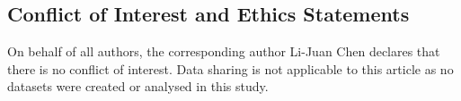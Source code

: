 \documentclass[11pt,reqno]{amsart}
\theoremstyle{definition} \newtheorem{remark}[theorem]{Remark}
\numberwithin{equation}{section}
\newcommand\1{\mathbbm{1}}
\begin{document}
\subsection*{Conflict of Interest and Ethics Statements}
On behalf of all authors, the corresponding author Li-Juan Chen declares that there is no conflict of interest. Data sharing is not applicable to this article as no datasets were created or analysed in this study.





%


\end{document}
